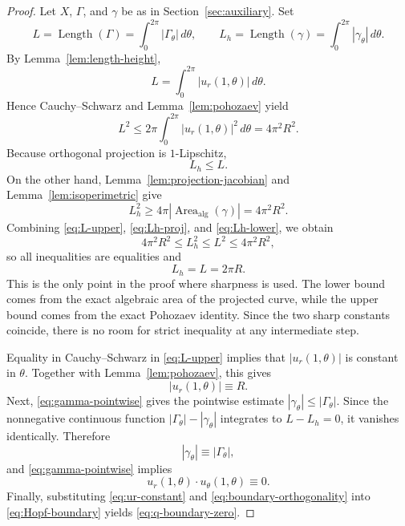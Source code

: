 \documentclass[11pt]{amsart}
\numberwithin{equation}{section}
\theoremstyle{remark}
\newcommand{\AlgArea}{\operatorname{Area}_{\mathrm{alg}}}
\DeclareMathOperator{\Length}{Length}
\begin{document}
\begin{proof}
Let $X$, $\Gamma$, and $\gamma$ be as in Section~\ref{sec:auxiliary}. Set
\[
L=\Length(\Gamma)=\int_0^{2\pi}|\Gamma_\theta|\,d\theta,
\qquad
L_h=\Length(\gamma)=\int_0^{2\pi}|\gamma_\theta|\,d\theta.
\]
By Lemma~\ref{lem:length-height},
\[
L=\int_0^{2\pi}|u_r(1,\theta)|\,d\theta.
\]
Hence Cauchy--Schwarz and Lemma~\ref{lem:pohozaev} yield
\begin{equation}\label{eq:L-upper}
L^2
\le 2\pi\int_0^{2\pi}|u_r(1,\theta)|^2\,d\theta
=4\pi^2R^2.
\end{equation}
Because orthogonal projection is $1$-Lipschitz,
\begin{equation}\label{eq:Lh-proj}
L_h\le L.
\end{equation}
On the other hand, Lemma~\ref{lem:projection-jacobian} and Lemma~\ref{lem:isoperimetric} give
\begin{equation}\label{eq:Lh-lower}
L_h^2\ge 4\pi |\AlgArea(\gamma)|=4\pi^2R^2.
\end{equation}
Combining \eqref{eq:L-upper}, \eqref{eq:Lh-proj}, and \eqref{eq:Lh-lower}, we obtain
\[
4\pi^2R^2\le L_h^2\le L^2\le 4\pi^2R^2,
\]
so all inequalities are equalities and
\[
L_h=L=2\pi R.
\]
This is the only point in the proof where sharpness is used. The lower bound comes from the exact algebraic area of the projected curve, while
the upper bound comes from the exact Pohozaev identity. Since the two sharp constants coincide, there is no room for strict inequality at any
intermediate step.

Equality in Cauchy--Schwarz in \eqref{eq:L-upper} implies that $|u_r(1,\theta)|$ is constant in $\theta$. Together with
Lemma~\ref{lem:pohozaev}, this gives
\begin{equation}\label{eq:ur-constant}
|u_r(1,\theta)|\equiv R.
\end{equation}
Next, \eqref{eq:gamma-pointwise} gives the pointwise estimate $|\gamma_\theta|\le |\Gamma_\theta|$. Since the nonnegative continuous function
$|\Gamma_\theta|-|\gamma_\theta|$ integrates to $L-L_h=0$, it vanishes identically. Therefore
\[
|\gamma_\theta|\equiv |\Gamma_\theta|,
\]
and \eqref{eq:gamma-pointwise} implies
\begin{equation}\label{eq:boundary-orthogonality}
 u_r(1,\theta)\cdot u_\theta(1,\theta)\equiv0.
\end{equation}
Finally, substituting \eqref{eq:ur-constant} and \eqref{eq:boundary-orthogonality} into \eqref{eq:Hopf-boundary} yields
\eqref{eq:q-boundary-zero}.
\end{proof}
\end{document}
